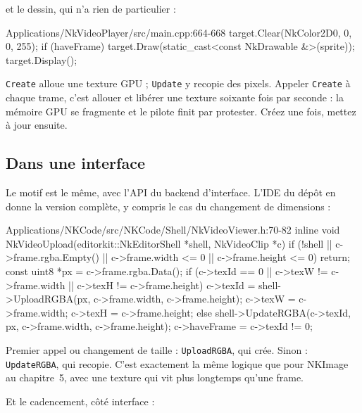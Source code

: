 et le dessin, qui n'a rien de particulier :

\begin{nkcode}{Applications/NkVideoPlayer/src/main.cpp:664-668}
        target.Clear(NkColor2D{0, 0, 0, 255});
        if (haveFrame)
            target.Draw(static_cast<const NkDrawable &>(sprite));
        target.Display();
\end{nkcode}

\begin{nkpiege}
\texttt{Create} alloue une texture GPU ; \texttt{Update} y recopie des pixels.
Appeler \texttt{Create} à chaque trame, c'est allouer et libérer une texture
soixante fois par seconde : la mémoire GPU se fragmente et le pilote finit par
protester. Créez une fois, mettez à jour ensuite.
\end{nkpiege}

\subsection{Dans une interface}

Le motif est le même, avec l'API du backend d'interface. L'IDE du dépôt en donne
la version complète, y compris le cas du changement de dimensions :

\begin{nkcode}{Applications/NKCode/src/NKCode/Shell/NkVideoViewer.h:70-82}
        inline void NkVideoUpload(editorkit::NkEditorShell *shell, NkVideoClip *c) {
            if (!shell || c->frame.rgba.Empty() || c->frame.width <= 0 || c->frame.height <= 0)
                return;
            const uint8 *px = c->frame.rgba.Data();
            if (c->texId == 0 || c->texW != c->frame.width || c->texH != c->frame.height) {
                c->texId = shell->UploadRGBA(px, c->frame.width, c->frame.height);
                c->texW = c->frame.width;
                c->texH = c->frame.height;
            } else {
                shell->UpdateRGBA(c->texId, px, c->frame.width, c->frame.height);
            }
            c->haveFrame = c->texId != 0;
        }
\end{nkcode}

Premier appel ou changement de taille : \texttt{UploadRGBA}, qui crée. Sinon :
\texttt{UpdateRGBA}, qui recopie. C'est exactement la même logique que pour
NKImage au chapitre~5, avec une texture qui vit plus longtemps qu'une frame.

Et le cadencement, côté interface :

